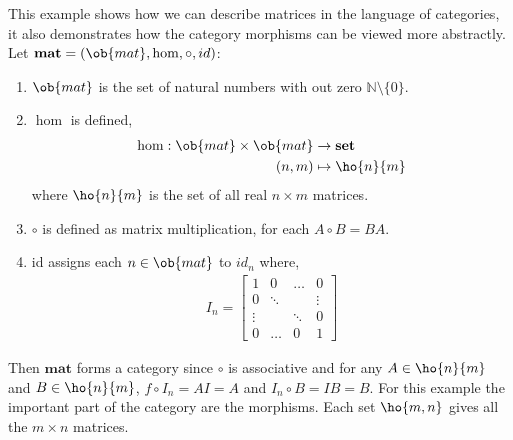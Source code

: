 \begin{example}
This example shows how we can describe matrices in the language of categories, it also demonstrates how the category morphisms can be viewed more abstractly. Let $\mathbf{mat} = (\ob{mat},\hom,\circ,id)$:
\begin{enumerate}
    \item $\ob{mat}$ is the set of natural numbers with out zero $\mathbb{N}\setminus{\{0\}}$.
    \item $\hom$ is defined,
    \begin{align*}
        \hom: \ob{mat}\times\ob{mat}&\rightarrow \mathbf{set}\\
        (n,m)&\mapsto\ho{n}{m}
    \end{align*}
    where $\ho{n}{m}$ is the set of all real $n\times m$ matrices.
    \item $\circ$ is defined as matrix multiplication, for each $A\circ B = BA$.
    \item id assigns each $n\in\ob{mat}$ to $id_{n}$ where,
    \begin{align*}
    I_{n} = \begin{bmatrix} 
    1 & 0 & \dots & 0\\
    0& \ddots& & \vdots\\
    \vdots& & \ddots & 0 \\
    0 &\dots& 0&  1
    \end{bmatrix}
    \end{align*}
\end{enumerate}
Then $\mathbf{mat}$ forms a category since $\circ$ is associative and for any $A\in\ho{n}{m}$ and $B\in\ho{n}{m}$, $f\circ I_{n} = AI = A$ and $I_{n}\circ B= IB = B$.
For this example the important part of the category are the morphisms. Each set $\ho{m,n}$ gives all the $m\times n$ matrices. 
\end{example}

